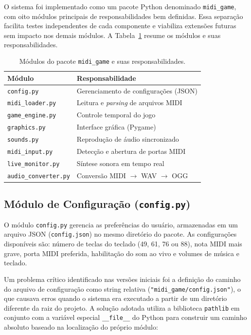 \documentclass[
  12pt,
  openright,
  twoside,
  a4paper,
  english,
  brazil
]{abntex2}
\begin{document}
O sistema foi implementado como um pacote Python denominado
\texttt{midi\_game}, com oito módulos principais de responsabilidades
bem definidas. Essa separação facilita testes independentes de cada
componente e viabiliza extensões futuras sem impacto nos demais módulos.
A Tabela~\ref{tab:modulos} resume os módulos e suas responsabilidades.

\begin{table}[htbp]
  \centering
  \caption{Módulos do pacote \texttt{midi\_game} e suas responsabilidades.}
  \label{tab:modulos}
  \begin{tabular}{@{}ll@{}}
    \toprule
    \textbf{Módulo} & \textbf{Responsabilidade} \\
    \midrule
    \texttt{config.py}          & Gerenciamento de configurações (JSON) \\
    \texttt{midi\_loader.py}    & Leitura e \textit{parsing} de arquivos MIDI \\
    \texttt{game\_engine.py}    & Controle temporal do jogo \\
    \texttt{graphics.py}        & Interface gráfica (Pygame) \\
    \texttt{sounds.py}          & Reprodução de áudio sincronizado \\
    \texttt{midi\_input.py}     & Detecção e abertura de portas MIDI \\
    \texttt{live\_monitor.py}   & Síntese sonora em tempo real \\
    \texttt{audio\_converter.py}& Conversão MIDI $\to$ WAV $\to$ OGG \\
    \bottomrule
  \end{tabular}
\end{table}

\subsection{Módulo de Configuração (\texttt{config.py})}

O módulo \texttt{config.py} gerencia as preferências do usuário,
armazenadas em um arquivo JSON (\texttt{config.json}) no mesmo diretório
do pacote. As configurações disponíveis são: número de teclas do teclado
(49, 61, 76 ou 88), nota MIDI mais grave, porta MIDI preferida,
habilitação do som ao vivo e volumes de música e teclado.

Um problema crítico identificado nas versões iniciais foi a definição
do caminho do arquivo de configuração como string relativa
(\texttt{"midi\_game/config.json"}), o que causava erros quando o sistema
era executado a partir de um diretório diferente da raiz do projeto. A
solução adotada utiliza a biblioteca \texttt{pathlib} em conjunto com a
variável especial \texttt{\_\_file\_\_} do Python para construir um
caminho absoluto baseado na localização do próprio módulo:
\end{document}
